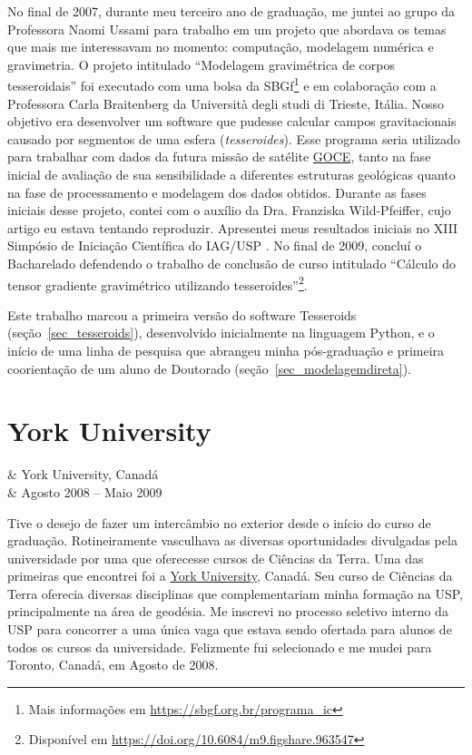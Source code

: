 \documentclass[10pt,a4paper,oneside]{book}
\newcommand{\Trieste}{Università degli studi di Trieste}
\begin{document}
No final de 2007, durante meu terceiro ano de graduação, me juntei ao grupo da
Professora Naomi Ussami para trabalho em um projeto que abordava os temas que
mais me interessavam no momento: computação, modelagem numérica e gravimetria.
O projeto intitulado ``Modelagem gravimétrica de corpos tesseroidais'' foi
executado com uma bolsa da
SBGf\footnote{Mais informações em \url{https://sbgf.org.br/programa_ic}}
e em colaboração com a Professora Carla Braitenberg da \Trieste{}, Itália.
Nosso objetivo era desenvolver um software que pudesse calcular campos
gravitacionais causado por segmentos de uma esfera (\textit{tesseroides}).
Esse programa seria utilizado para trabalhar com dados da futura missão de
satélite \href{https://www.esa.int/Enabling_Support/Operations/GOCE}{GOCE},
tanto na fase inicial de avaliação de sua sensibilidade a diferentes estruturas
geológicas quanto na fase de processamento e modelagem dos dados obtidos.
Durante as fases iniciais desse projeto, contei com o auxílio da Dra.
Franziska Wild-Pfeiffer, cujo artigo \citep{WildPfeiffer2008} eu estava
tentando reproduzir.
Apresentei meus resultados iniciais no XIII Simpósio de Iniciação Científica do
IAG/USP \citep{Uieda2008}.
No final de 2009, concluí o Bacharelado defendendo o trabalho de conclusão de
curso intitulado ``Cálculo do tensor gradiente gravimétrico utilizando
tesseroides''\footnote{Disponível em \url{https://doi.org/10.6084/m9.figshare.963547}}.

Este trabalho marcou a primeira versão do software Tesseroids
(seção~\ref{sec_tesseroids}), desenvolvido inicialmente na linguagem Python,
e o início de uma linha de pesquisa que abrangeu minha pós-graduação e primeira
coorientação de um aluno de Doutorado (seção~\ref{sec_modelagemdireta}).

\section{York University}
\label{sec_york}

\begin{subsummarybox}[frametitle=\faPlane{}\quad Intercâmbio internacional]
  \begin{fa-ul}
    \faUniversity & York University, Canadá\\
    \faCalendar & Agosto 2008 -- Maio 2009
  \end{fa-ul}
\end{subsummarybox}

Tive o desejo de fazer um intercâmbio no exterior desde o início do curso de
graduação.
Rotineiramente vasculhava as diversas oportunidades divulgadas pela
universidade por uma que oferecesse cursos de Ciências da Terra.
Uma das primeiras que encontrei foi a \href{https://www.yorku.ca/}{York University},
Canadá.
Seu curso de Ciências da Terra oferecia diversas disciplinas que
complementariam minha formação na USP, principalmente na área de geodésia.
Me inscrevi no processo seletivo interno da USP para concorrer a uma única vaga
que estava sendo ofertada para alunos de todos os cursos da universidade.
Felizmente fui selecionado e me mudei para Toronto, Canadá, em Agosto de 2008.
\end{document}
